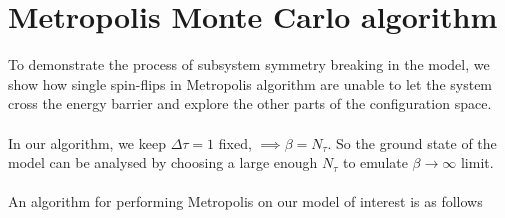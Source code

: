 \documentclass[../journal_main.tex]{subfiles}
\begin{document}
\section{Metropolis Monte Carlo algorithm}

To demonstrate the process of subsystem symmetry breaking in the model, we show how single spin-flips in Metropolis algorithm are unable to let the system cross the energy barrier and explore the other parts of the configuration space.~\\~\\
In our algorithm, we keep $\Delta \tau = 1$ fixed, $\implies \beta = N_\tau $. So the ground state of the model can be analysed by choosing a large enough $N_\tau $ to emulate $\beta \to \infty$ limit.~\\~\\
An algorithm for performing Metropolis on our model of interest is as follows
\end{document}
